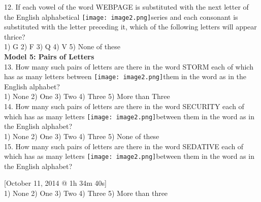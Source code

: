 \documentclass[
]{article}
\begin{document}
12. If each vowel of the word WEBPAGE is substituted with the next letter of the English
alphabetical  \texttt{[image: image2.png]}series and each consonant is substituted with the letter preceding it, which of
the following letters will appear thrice?\\
1) G \hspace{2mm}2) F \hspace{2mm}3) Q \hspace{2mm}4) V \hspace{2mm}5) None of these\\

\textbf{Model 5: Pairs of Letters}\\

13. How many such pairs of letters are there in the word STORM each of which has as many
letters between \texttt{[image: image2.png]}them in the word as in the English alphabet?\\
1) None \hspace{2mm}2) One \hspace{2mm}3) Two \hspace{2mm}4) Three \hspace{2mm}5) More than Three\\

14. How many such pairs of letters are there in the word SECURITY each of which has as many
letters \texttt{[image: image2.png]}between them in the word as in the English alphabet?\\
1) None \hspace{2mm}2) One \hspace{2mm}3) Two \hspace{2mm}4) Three \hspace{2mm}5) None of these\\

15. How many such pairs of letters are there in the word SEDATIVE each of which has as many
letters \texttt{[image: image2.png]}between them in the word as in the English alphabet?

[October 11, 2014 @ 1h 34m 40s]\\
1) None \hspace{2mm}2) One \hspace{2mm}3) Two \hspace{2mm}4) Three \hspace{2mm}5) More than three\\
\end{document}
